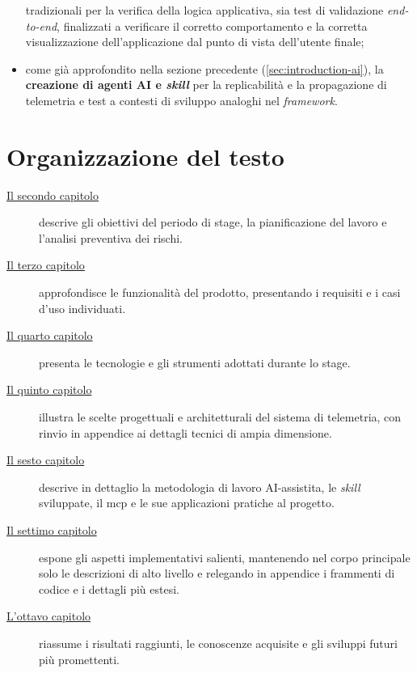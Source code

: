 \begin{itemize}
            tradizionali per la verifica della logica applicativa, sia test di validazione \emph{end-to-end},
            finalizzati a verificare il corretto comportamento e la corretta visualizzazione dell’applicazione
            dal punto di vista dell’utente finale;
      \item come già approfondito nella sezione precedente (\ref{sec:introduction-ai}),
            la \textbf{creazione di agenti AI e \emph{skill}} per la replicabilità e la propagazione
            di telemetria e test a contesti di sviluppo analoghi nel \emph{framework}.
\end{itemize}

\section{Organizzazione del testo}

\begin{description}
      \item[{\hyperref[cap:descrizione-stage]{Il secondo capitolo}}] descrive
            gli obiettivi del periodo di stage, la pianificazione del lavoro e
            l'analisi preventiva dei rischi.

      \item[{\hyperref[cap:analisi-requisiti]{Il terzo capitolo}}]
            approfondisce le funzionalità del prodotto, presentando i requisiti
            e i casi d'uso individuati.

      \item[{\hyperref[cap:tecnologie-adottate]{Il quarto capitolo}}] presenta
            le tecnologie e gli strumenti adottati durante lo stage.

      \item[{\hyperref[cap:progettazione]{Il quinto capitolo}}] illustra le
            scelte progettuali e architetturali del sistema di telemetria, con
            rinvio in appendice ai dettagli tecnici di ampia dimensione.

      \item[{\hyperref[cap:metodologia-ai]{Il sesto capitolo}}] descrive in
            dettaglio la metodologia di lavoro AI-assistita, le \emph{skill}
            sviluppate, il \gls{mcp} e le sue applicazioni
            pratiche al progetto.

      \item[{\hyperref[cap:codifica]{Il settimo capitolo}}] espone gli aspetti
            implementativi salienti, mantenendo nel corpo principale solo le
            descrizioni di alto livello e relegando in appendice i frammenti di
            codice e i dettagli più estesi.

      \item[{\hyperref[cap:conclusioni]{L'ottavo capitolo}}] riassume i
            risultati raggiunti, le conoscenze acquisite e gli sviluppi futuri
            più promettenti.
\end{description}

